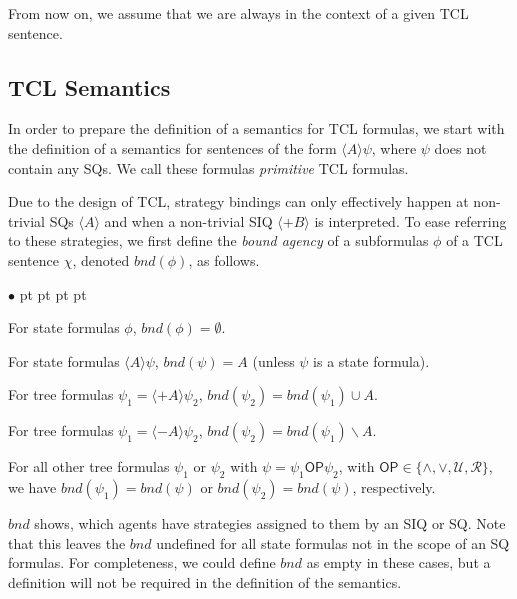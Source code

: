 \documentclass{llncs}
\newcommand{\embnd}{\textit{bnd}}
\newcommand{\pfrr}{\Box}
\newcommand{\until}{\textrm{U}} %
\newcommand{\rmrel}{\textrm{R}} %
\newcommand{\pevt}{\Diamond}
\newenvironment{list1}{\begin{list}{$\bullet$}
{\topsep 0 pt \parsep 0 pt \partopsep 0 pt \itemsep 0 pt}}{\end{list}}
\begin{document}


From now on, we assume that we are always in the context of a
given TCL sentence. %






\subsection{TCL Semantics 
  \label{subsec.psil.semantics}}

In order to prepare the definition of a semantics for TCL formulas, 
we start with the definition of a semantics for sentences 
of the form $\langle A \rangle \psi$, where $\psi$ does not contain any SQs.
We call these formulas \emph{primitive} TCL formulas.

Due to the design of TCL, strategy bindings can only effectively happen at non-trivial SQs $\langle A \rangle$ and 
when a non-trivial SIQ $\langle +B\rangle$ is interpreted.
%
To ease referring to these strategies, we first define the \emph{bound agency} of a subformulas $\phi$ of a TCL sentence $\chi$, denoted $\embnd(\phi)$, as follows.
\begin{list1} 
\item For state formulas $\phi$, $\embnd(\phi)= \emptyset$.  
\item For state formulas $\langle A \rangle \psi$,  $\embnd(\psi)= A$ (unless $\psi$ is a state formula).
\item For tree formulas $\psi_1=\langle +A \rangle \psi_2$,  $\embnd(\psi_2) = \embnd(\psi_1) \cup A$.
\item For tree formulas $\psi_1=\langle -A \rangle \psi_2$,  $\embnd(\psi_2) = \embnd(\psi_1) \smallsetminus A$.
\item For all other tree formulas $\psi_1$ or $\psi_2$ with $\psi = \psi_1 \mathsf{OP} \psi_2$, with $\mathsf{OP} \in \{\wedge,\vee,\mathcal U, \mathcal R\}$, we have $\embnd(\psi_1) = \embnd(\psi)$ or $\embnd(\psi_2) = \embnd(\psi)$, respectively.
\end{list1} 
$\embnd$ shows, which agents have strategies assigned to them 
by an SIQ or SQ.
Note that this leaves the $\embnd$ undefined for all state formulas not in the scope of an SQ formulas.
For completeness, we could define $\embnd$ as empty in these cases, but a definition will not be required in the definition of the semantics.
\end{document}
